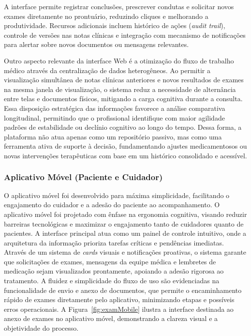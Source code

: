 \documentclass[conference,a4paper,10pt]{IEEETran}
\begin{document}
A interface permite registrar conclusões, prescrever condutas e solicitar novos exames diretamente no prontuário, reduzindo cliques e melhorando a produtividade. Recursos adicionais incluem histórico de ações (\textit{audit trail}), controle de versões nas notas clínicas e integração com mecanismo de notificações para alertar sobre novos documentos ou mensagens relevantes.

Outro aspecto relevante da interface Web é a otimização do fluxo de trabalho médico através da centralização de dados heterogêneos. Ao permitir a visualização simultânea de notas clínicas anteriores e novos resultados de exames na mesma janela de visualização, o sistema reduz a necessidade de alternância entre telas e documentos físicos, mitigando a carga cognitiva durante a consulta. Essa disposição estratégica das informações favorece a análise comparativa longitudinal, permitindo que o profissional identifique com maior agilidade padrões de estabilidade ou declínio cognitivo ao longo do tempo. Dessa forma, a plataforma não atua apenas como um repositório passivo, mas como uma ferramenta ativa de suporte à decisão, fundamentando ajustes medicamentosos ou novas intervenções terapêuticas com base em um histórico consolidado e acessível.

\subsubsection{Aplicativo Móvel (Paciente e Cuidador)}
O aplicativo móvel foi desenvolvido para máxima simplicidade, facilitando o engajamento do cuidador e a adesão do paciente ao acompanhamento. O aplicativo móvel foi projetado com ênfase na ergonomia cognitiva, visando reduzir barreiras tecnológicas e maximizar o engajamento tanto de cuidadores quanto de pacientes. A interface principal atua como um painel de controle intuitivo, onde a arquitetura da informação prioriza tarefas críticas e pendências imediatas. Através de um sistema de \textit{cards} visuais e notificações proativas, o sistema garante que solicitações de exames, mensagens da equipe médica e lembretes de medicação sejam visualizados prontamente, apoiando a adesão rigorosa ao tratamento. A fluidez e simplicidade do fluxo de uso são evidenciadas na funcionalidade de envio e anexo de documentos, que permite o encaminhamento rápido de exames diretamente pelo aplicativo, minimizando etapas e possíveis erros operacionais. A Figura~\ref{fig:examMobile} ilustra a interface destinada ao anexo de exames no aplicativo móvel, demonstrando a clareza visual e a objetividade do processo.
\end{document}
